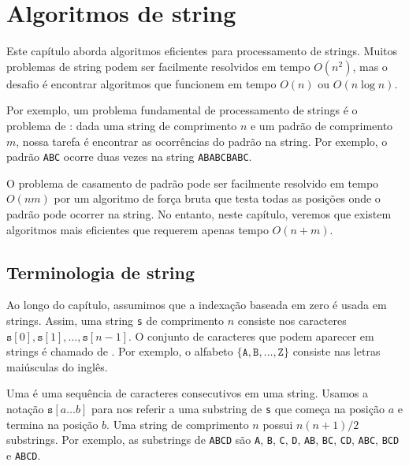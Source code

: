 \chapter{Algoritmos de string}

Este capítulo aborda algoritmos eficientes para processamento de strings. Muitos problemas de string podem ser facilmente resolvidos em tempo $O(n^2)$, mas o desafio é encontrar algoritmos que funcionem em tempo $O(n)$ ou $O(n \log n)$.


Por exemplo, um problema fundamental de processamento de strings é o problema de : dada uma string de comprimento $n$ e um padrão de comprimento $m$, nossa tarefa é encontrar as ocorrências do padrão na string. Por exemplo, o padrão \texttt{ABC} ocorre duas vezes na string \texttt{ABABCBABC}.

O problema de casamento de padrão pode ser facilmente resolvido em tempo $O(nm)$ por um algoritmo de força bruta que testa todas as posições onde o padrão pode ocorrer na string. No entanto, neste capítulo, veremos que existem algoritmos mais eficientes que requerem apenas tempo $O(n+m)$.


\section{Terminologia de string}


Ao longo do capítulo, assumimos que a indexação baseada em zero é usada em strings. Assim, uma string \texttt{s} de comprimento $n$ consiste nos caracteres $\texttt{s}[0],\texttt{s}[1],\ldots,\texttt{s}[n-1]$. O conjunto de caracteres que podem aparecer em strings é chamado de . Por exemplo, o alfabeto $\{\texttt{A},\texttt{B},\ldots,\texttt{Z}\}$ consiste nas letras maiúsculas do inglês.


Uma  é uma sequência de caracteres consecutivos em uma string. Usamos a notação $\texttt{s}[a \ldots b]$ para nos referir a uma substring de \texttt{s} que começa na posição $a$ e termina na posição $b$. Uma string de comprimento $n$ possui $n(n+1)/2$ substrings. Por exemplo, as substrings de \texttt{ABCD} são \texttt{A}, \texttt{B}, \texttt{C}, \texttt{D}, \texttt{AB}, \texttt{BC}, \texttt{CD}, \texttt{ABC}, \texttt{BCD} e \texttt{ABCD}.

